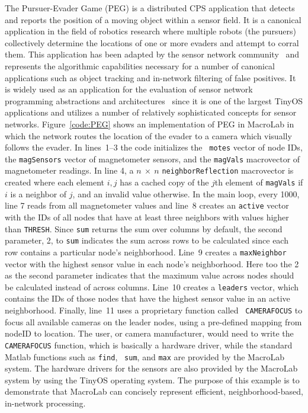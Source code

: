 The Pursuer-Evader Game (PEG) is a distributed CPS application that detects and
reports the position of a moving object within a sensor field.  It is a
canonical application in the field of robotics research where multiple robots
(the pursuers) collectively determine the locations of one or more evaders and
attempt to corral them. This application has been adapted by the sensor network
community~\cite{Sharp,Brooks,Li} and represents the algorithmic capabilities
necessary for a number of canonical applications such as object tracking and
in-network filtering of false positives. It is widely used as an application for
the evaluation of sensor network programming abstractions and
architectures~\cite{Whitehousea,Kothari,Gnawali} since it is one of the largest
TinyOS applications and utilizes a number of relatively sophisticated concepts
for sensor networks.  Figure~\ref{code:PEG} shows an implementation of PEG in
MacroLab in which the network routes the location of the evader to a camera
which visually follows the evader. In lines~1--3 the code initializes the {\tt
motes} vector of node IDs, the {\tt magSensors} vector of magnetometer sensors,
and the {\tt magVals} macrovector of magnetometer readings.  In line 4, a $n \
\times \ n$ {\tt neighborReflection} macrovector is created where each element
$i,j$ has a cached copy of the $j$th element of {\tt magVals} if $i$ is a
neighbor of $j$, and an invalid value otherwise.  In the main loop, every
1000\ms, line 7 reads from all magnetometer values and line~8 creates an
{\tt active} vector with the IDs of all nodes that have at least three neighbors
with values higher than {\tt THRESH}. Since {\tt sum} returns the sum over
columns by default, the second parameter, 2, to {\tt sum} indicates the sum
across rows to be calculated since each row contains a particular node's
neighborhood. Line~9 creates a {\tt maxNeighbor} vector with the highest
sensor value in each node's neighborhood. Here too the 2 as the second parameter
indicates that the maximum value across nodes should be calculated instead of
across columns. Line~10 creates a {\tt leaders} vector, which contains the IDs of
those nodes that have the highest sensor value in an active
neighborhood. Finally, line~11 uses a proprietary function called {\tt
CAMERAFOCUS} to focus all available cameras on the leader nodes, using a
pre-defined mapping from nodeID to location. The user, or camera manufacturer,
would need to write the {\tt CAMERAFOCUS} function, which is basically a
hardware driver, while the standard Matlab functions such as {\tt find}, {\tt
sum}, and {\tt max} are provided by the MacroLab system. The hardware drivers
for the sensors are also provided by the MacroLab system by using the TinyOS
operating system.  The purpose of this example is to demonstrate that MacroLab
can concisely represent efficient, neighborhood-based, in-network processing.


